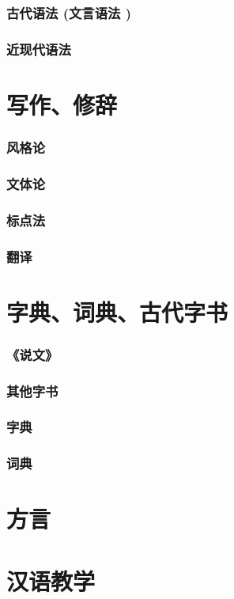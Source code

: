 \documentclass[UTF8]{../../RepresentationUniverse}
\begin{document}
    \subsubsection{古代语法 (文言语法 )}
    \subsubsection{近现代语法}
\section{写作、修辞}
    \subsubsection{风格论}
    \subsubsection{文体论}
    \subsubsection{标点法}
    \subsubsection{翻译}
\section{ 字典、词典、古代字书}
    \subsubsection{《说文》}
    \subsubsection{其他字书}
    \subsubsection{字典}
    \subsubsection{词典}
\section{方言}
\section{汉语教学}
\end{document}
